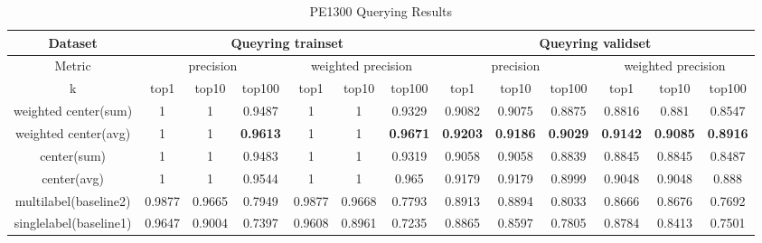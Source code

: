 \begin{table*}[!htb]%
\caption{PE1300 Querying Results}
\label{tab:pe_result}
\begin{minipage}{\textwidth}
\begin{center}
\begin{tabular}{|c|c|c|c|c|c|c|c|c|c|c|c|c|}
\hline
Dataset             & \multicolumn{6}{c|}{Queyring trainset}                      & \multicolumn{6}{c|}{Queyring validset}                      \\ \hline
Metric              & \multicolumn{3}{c|}{precision}  & \multicolumn{3}{c|}{weighted precision} & \multicolumn{3}{c|}{precision}  & \multicolumn{3}{c|}{weighted precision} \\ \hline
k              & top1   & top10  & top100 & top1      & top10     & top100   & top1   & top10  & top100 & top1      & top10     & top100   \\ \hline
weighted center(sum)  & 1      & 1      & 0.9487 & 1         & 1         & 0.9329   & 0.9082 & 0.9075 & 0.8875 & 0.8816    & 0.881     & 0.8547   \\ \hline
weighted center(avg) & 1      & 1      & \textbf{0.9613} & 1         & 1         & \textbf{0.9671}   & \textbf{0.9203} & \textbf{0.9186} & \textbf{0.9029 }& \textbf{0.9142}    &\textbf{ 0.9085}    & \textbf{0.8916}   \\ \hline
center(sum)         & 1      & 1      & 0.9483 & 1         & 1         & 0.9319   & 0.9058 & 0.9058 & 0.8839 & 0.8845    & 0.8845    & 0.8487   \\ \hline
center(avg)        & 1      & 1      & 0.9544 & 1         & 1         & 0.965    & 0.9179 & 0.9179 & 0.8999 & 0.9048    & 0.9048    & 0.888    \\ \hline
multilabel(baseline2)               & 0.9877 & 0.9665 & 0.7949 & 0.9877    & 0.9668    & 0.7793   & 0.8913 & 0.8894 & 0.8033 & 0.8666    & 0.8676    & 0.7692   \\ \hline
singlelabel(baseline1)              & 0.9647 & 0.9004 & 0.7397 & 0.9608    & 0.8961    & 0.7235   & 0.8865 & 0.8597 & 0.7805 & 0.8784    & 0.8413    & 0.7501   \\ \hline
\end{tabular}
\end{center}
\bigskip\centering

\end{minipage}
\end{table*}%






